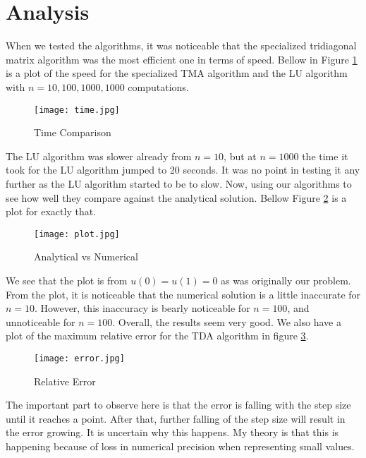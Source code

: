 \documentclass{article}
\begin{document}
\section{Analysis}
When we tested the algorithms, it was noticeable that the specialized tridiagonal matrix algorithm was the most efficient one in terms of speed. Bellow in Figure \ref{fig:time} is a plot of the speed for the specialized TMA algorithm and the LU algorithm with $n=10,100,1000,1000$ computations.
\begin{figure}[H]
\centering
 \texttt{[image: time.jpg]}
\caption{Time Comparison}
\label{fig:time}
\end{figure}

The LU algorithm was slower already from $n=10$, but at $n=1000$ the time it took for the LU algorithm jumped to 20 seconds. It was no point in testing it any further as the LU algorithm started to be to slow. 
\newline\newline
Now, using our algorithms to see how well they compare against the analytical solution. Bellow Figure \ref{fig:plot} is a plot for exactly that. 

\begin{figure}[H]
\centering
\texttt{[image: plot.jpg]}
\caption{Analytical vs Numerical}
\label{fig:plot}
\end{figure}

We see that the plot is from $u(0)=u(1)=0$ as was originally our problem. From the plot, it is noticeable that the numerical solution is a little inaccurate for $n=10$. However, this inaccuracy is bearly noticeable for $n=100$, and unnoticeable for $n=100$. Overall, the results seem very good.
\newline\newline
We also have a plot of the maximum relative error for the TDA algorithm in figure \ref{fig:error}. 
\begin{figure}[H]
\centering
\texttt{[image: error.jpg]}
\caption{Relative Error}
\label{fig:error}
\end{figure}

The important part to observe here is that the error is falling with the step size until it reaches a point. After that, further falling of the step size will result in the error growing. It is uncertain why this happens. My theory is that this is happening because of loss in numerical precision when representing small values.
\end{document}
